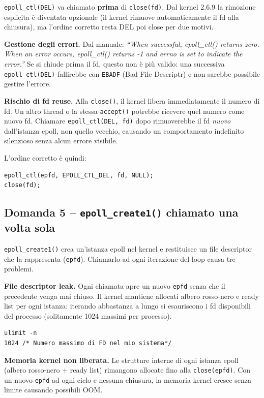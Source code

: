 \documentclass[a4paper,12pt]{article}
\begin{document}
\texttt{epoll\_ctl(DEL)} va chiamato \textbf{prima} di \texttt{close(fd)}. Dal kernel
2.6.9 la rimozione esplicita è diventata opzionale (il kernel rimuove automaticamente
il fd alla chiusura), ma l'ordine corretto resta DEL poi close per due motivi.

\textbf{Gestione degli errori.} Dal manuale: \textit{``When successful, epoll\_ctl()
returns zero. When an error occurs, epoll\_ctl() returns -1 and errno is set to
indicate the error.''} Se si chiude prima il fd, questo non è più valido: una
successiva \texttt{epoll\_ctl(DEL)} fallirebbe con \texttt{EBADF} (Bad File
Descriptr) e non sarebbe possibile gestire l'errore.

\textbf{Rischio di fd reuse.} Alla \texttt{close()}, il kernel libera immediatamente
il numero di fd. Un altro thread o la stessa \texttt{accept()} potrebbe ricevere
quel numero come nuovo fd. Chiamare \texttt{epoll\_ctl(DEL, fd)} dopo rimuoverebbe
il fd \emph{nuovo} dall'istanza epoll, non quello vecchio, causando un comportamento
indefinito silenzioso senza alcun errore visibile.

L'ordine corretto è quindi:
\begin{lstlisting}
epoll_ctl(epfd, EPOLL_CTL_DEL, fd, NULL);
close(fd);
\end{lstlisting}

\subsection*{Domanda 5 -- \texttt{epoll\_create1()} chiamato una volta sola}

\texttt{epoll\_create1()} crea un'istanza epoll nel kernel e restituisce un file
descriptor che la rappresenta (\texttt{epfd}). Chiamarlo ad ogni iterazione del loop
causa tre problemi.

\textbf{File descriptor leak.} Ogni chiamata apre un nuovo \texttt{epfd} senza che
il precedente venga mai chiuso. Il kernel mantiene allocati albero rosso-nero e ready
list per ogni istanza: iterando abbastanza a lungo si esauriscono i fd disponibili
del processo (solitamente 1024 massimi per processo).

\begin{lstlisting}
ulimit -n
1024 /* Numero massimo di FD nel mio sistema*/
\end{lstlisting}

\textbf{Memoria kernel non liberata.} Le strutture interne di ogni istanza epoll
(albero rosso-nero + ready list) rimangono allocate fino alla \texttt{close(epfd)}.
Con un nuovo \texttt{epfd} ad ogni ciclo e nessuna chiusura, la memoria kernel cresce
senza limite causando possibili OOM.
\end{document}
